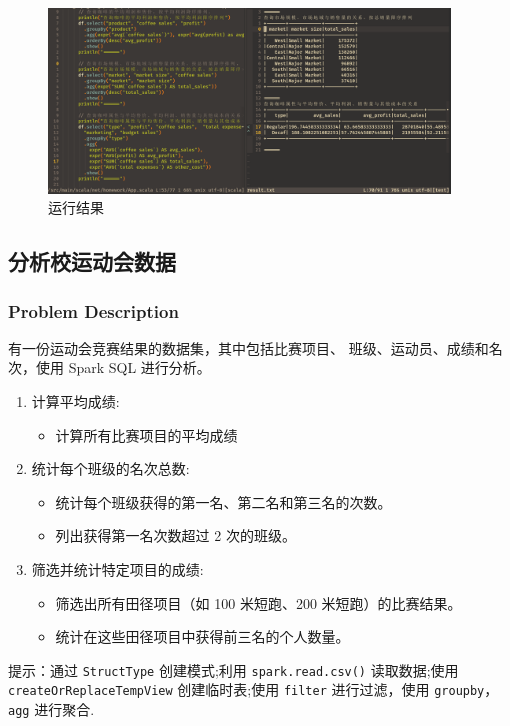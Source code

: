 \documentclass{article}
\def\code#1{\texttt{#1}}
\begin{document}
\begin{figure}[H]
  \begin{center}
    \includegraphics[width=0.95\textwidth]{./figures/2-3.png}
  \end{center}
  \caption{运行结果}
\end{figure}

\subsection{分析校运动会数据}
\subsubsection{Problem Description}
有一份运动会竞赛结果的数据集，其中包括比赛项目、
班级、运动员、成绩和名次，使用 Spark SQL 进行分析。

\begin{enumerate}
  \item 计算平均成绩:
    \begin{itemize}
      \item 计算所有比赛项目的平均成绩
    \end{itemize}
  \item 统计每个班级的名次总数:
    \begin{itemize}
      \item 统计每个班级获得的第一名、第二名和第三名的次数。
      \item 列出获得第一名次数超过 2 次的班级。
    \end{itemize}
  \item 筛选并统计特定项目的成绩:
    \begin{itemize}
      \item 筛选出所有田径项目（如 100 米短跑、200 米短跑）的比赛结果。
      \item 统计在这些田径项目中获得前三名的个人数量。
    \end{itemize}
\end{enumerate}
提示：通过 \code{StructType} 创建模式;利用 \code{spark.read.csv()} 读取数据;使用 \code{createOrReplaceTempView}
创建临时表;使用 \code{filter} 进行过滤，使用 \code{groupby}，\code{agg} 进行聚合.
\end{document}
